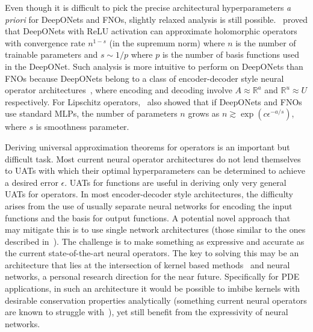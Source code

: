 \documentclass[12pt]{exam}
\def\R{\mathbb{R}}
\begin{document}
\begin{questions}
Even though it is difficult to pick the precise architectural hyperparameters \emph{a priori} for DeepONets and FNOs, slightly relaxed analysis is still possible.~\citep{herrmann2024neural} proved that DeepONets with ReLU activation can approximate holomorphic operators with convergence rate $n^{1-s}$ (in the supremum norm) where $n$ is the number of trainable parameters and $s \sim 1/p$ where $p$ is the number of basis functions used in the DeepONet. Such analysis is more intuitive to perform on DeepONets than FNOs because DeepONets belong to a class of encoder-decoder style neural operator architectures~\citep{kovachki2024operator}, where encoding and decoding involve $A \approx \R^a$ and $\R^u \approx U$ respectively. For Lipschitz operators,~\citep{kovachki2024operator} also showed that if DeepONets and FNOs use standard MLPs, the number of parameters $n$ grows as $n \gtrsim \exp(c \epsilon^{-a/s})$, where $s$ is smoothness parameter.

Deriving universal approximation theorems for operators is an important but difficult task. Most current neural operator architectures do not lend themselves to UATs with which their optimal hyperparameters can be determined to achieve a desired error $\epsilon$. UATs for functions are useful in deriving only very general UATs for operators. In most encoder-decoder style architectures, the difficulty arises from the use of usually separate neural networks for encoding the input functions and the basis for output functions. A potential novel approach that may mitigate this is to use single network architectures (those similar to the ones described in~\citep{chen1995universal}). The challenge is to make something as expressive and accurate as the current state-of-the-art neural operators. The key to solving this may be an architecture that lies at the intersection of kernel based methods~\citep{batlle2024kernel} and neural networks, a personal research direction for the near future. Specifically for PDE applications, in such an architecture it would be possible to imbibe kernels with desirable conservation properties analytically (something current neural operators are known to struggle with~\citep{khorrami2024physics}), yet still benefit from the expressivity of neural networks.
%
\pagebreak


\begin{parts}

\end{parts}
\end{questions}
\end{document}

